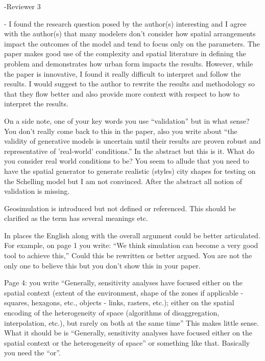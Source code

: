\documentclass[11pt,a4paper,sans]{moderncv}        %
\begin{document}
-Reviewer 3

  -
I found the research question posed by the author(s) interesting and I agree with the author(s) that many modelers don’t consider how spatial arrangements impact the outcomes of the model and tend to focus only on the parameters. The paper makes good use of the complexity and spatial literature in defining the problem and demonstrates how urban form impacts the results. However, while the paper is innovative, I found it really difficult to interpret and follow the results. I would suggest to the author to rewrite the results and methodology so that they flow better and also provide more context with respect to how to interpret the results.

 

On a side note, one of your key words you use “validation” but in what sense?  You don’t really come back to this in the paper, also you write about “the validity of generative models is uncertain until their results are proven robust and representative of ’real-world’ conditions.” In the abstract but this is it.  What do you consider real world conditions to be? You seem to allude that you need to have the spatial generator to generate realistic (styles) city shapes for testing on the Schelling model but I am not convinced.  After the abstract all notion of validation is missing.

 

Geosimulation is introduced but not defined or referenced.  This should be clarified as the term has several meanings etc.

 

In places the English along with the overall argument could be better articulated. For example, on page 1 you write: “We think simulation can become a very good tool to achieve this,”  Could this be rewritten or better argued. You are not the only one to believe this but you don’t show this in your paper.

 

Page 4: you write “Generally, sensitivity analyses have focused either on the spatial context (extent of the environment, shape of the zones if applicable - squares, hexagons, etc., objects - links, rasters, etc.); either on the spatial encoding of the heterogeneity of space (algorithms of disaggregation, interpolation, etc.), but rarely on both at the same time” This makes little sense. What it should be is “Generally, sensitivity analyses have focused either on the spatial context or the heterogeneity of space” or something like that. Basically you need the “or”.
\end{document}
